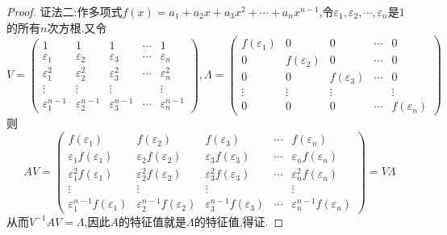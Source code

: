 \documentclass[../../main.tex]{subfiles}%
\begin{document}
\begin{proof}
{\color{blue}证法二:}作多项式\(f(x)=a_1 + a_2x + a_3x^2+\cdots+a_nx^{n - 1}\),令\(\varepsilon_1,\varepsilon_2,\cdots,\varepsilon_n\)是\(1\)的所有\(n\)次方根.又令
\[
V = 
\begin{pmatrix}
1 & 1 & 1 & \cdots & 1\\
\varepsilon_1 & \varepsilon_2 & \varepsilon_3 & \cdots & \varepsilon_n\\
\varepsilon_1^2 & \varepsilon_2^2 & \varepsilon_3^2 & \cdots & \varepsilon_n^2\\
\vdots & \vdots & \vdots & & \vdots\\
\varepsilon_1^{n - 1} & \varepsilon_2^{n - 1} & \varepsilon_3^{n - 1} & \cdots & \varepsilon_n^{n - 1}
\end{pmatrix},
\Lambda = 
\begin{pmatrix}
f(\varepsilon_1) & 0 & 0 & \cdots & 0\\
0 & f(\varepsilon_2) & 0 & \cdots & 0\\
0 & 0 & f(\varepsilon_3) & \cdots & 0\\
\vdots & \vdots & \vdots & & \vdots\\
0 & 0 & 0 & \cdots & f(\varepsilon_n)
\end{pmatrix}
\]
则
\[
AV = 
\begin{pmatrix}
f(\varepsilon_1) & f(\varepsilon_2) & f(\varepsilon_3) & \cdots & f(\varepsilon_n)\\
\varepsilon_1f(\varepsilon_1) & \varepsilon_2f(\varepsilon_2) & \varepsilon_3f(\varepsilon_3) & \cdots & \varepsilon_nf(\varepsilon_n)\\
\varepsilon_1^2f(\varepsilon_1) & \varepsilon_2^2f(\varepsilon_2) & \varepsilon_3^2f(\varepsilon_3) & \cdots & \varepsilon_n^2f(\varepsilon_n)\\
\vdots & \vdots & \vdots & & \vdots\\
\varepsilon_1^{n - 1}f(\varepsilon_1) & \varepsilon_2^{n - 1}f(\varepsilon_2) & \varepsilon_3^{n - 1}f(\varepsilon_3) & \cdots & \varepsilon_n^{n - 1}f(\varepsilon_n)
\end{pmatrix}
= V\Lambda
\]
从而$V^{-1}AV=\Lambda$,因此$A$的特征值就是$\Lambda$的特征值,得证.
\end{proof}
\end{document}
